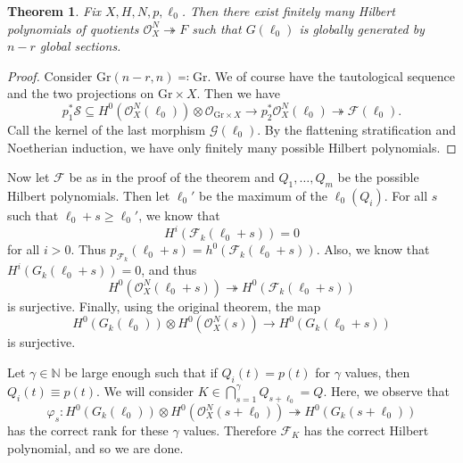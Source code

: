 \documentclass[leqno, openany]{memoir}
\newtheorem{thm}{Theorem}[section]
\theoremstyle{definition}
\theoremstyle{remark}
\theoremstyle{plain}
\theoremstyle{definition}
\theoremstyle{remark}
\newcommand{\mc}[1]{\mathcal{#1}}
\newcommand{\mr}[1]{\mathrm{#1}}
\begin{document}
\begin{thm}
    Fix $X, H, N, p, \ell_0$. Then there exist finitely many Hilbert polynomials of quotients $\mc{O}_X^N \twoheadrightarrow F$ such that $G(\ell_0)$ is globally generated by $n-r$ global sections.
\end{thm}

\begin{proof}
    Consider $\mr{Gr}(n-r, n) \eqqcolon \mr{Gr}$. We of course have the tautological sequence and the two projections on $\mr{Gr} \times X$. Then we have
    \[p_1^* \mc{S} \subseteq H^0(\mc{O}_X^N(\ell_0)) \otimes \mc{O}_{\mr{Gr} \times X} \to p_2^* \mc{O}_X^N(\ell_0) \twoheadrightarrow \mc{F}(\ell_0). \]
    Call the kernel of the last morphism $\mc{G}(\ell_0)$. By the flattening stratification and Noetherian induction, we have only finitely many possible Hilbert polynomials.
\end{proof}

Now let $\mc{F}$ be as in the proof of the theorem and $Q_1, \ldots, Q_m$ be the possible Hilbert polynomials. Then let $\ell_0'$ be the maximum of the $\ell_0(Q_i)$. For all $s$ such that $\ell_0 + s \geq \ell_0'$, we know that
\[ H^i(\mc{F}_k(\ell_0 + s)) = 0 \]
for all $i > 0$. Thus $p_{\mc{F}_k}(\ell_0 + s) = h^0(\mc{F}_k(\ell_0 + s))$. Also, we know that $H^i(G_k(\ell_0 + s)) = 0$, and thus 
\[ H^0(\mc{O}_X^N(\ell_0 + s)) \twoheadrightarrow H^0(\mc{F}_k(\ell_0 + s)) \]
is surjective. Finally, using the original theorem, the map
\[ H^0(G_k(\ell_0)) \otimes H^0(\mc{O}_X^N(s)) \to H^0(G_k(\ell_0 + s)) \]
is surjective.

Let $\gamma \in \mathbb{N}$ be large enough such that if $Q_i(t) = p(t)$ for $\gamma$ values, then $Q_i(t) \equiv p(t)$. We will consider $K \in \bigcap_{s = 1}^{\gamma} Q_{s + \ell_0} = Q$. Here, we observe that
\[ \varphi_s \colon H^0(G_k(\ell_0)) \otimes H^0(\mc{O}_X^N(s+\ell_0)) \twoheadrightarrow H^0(G_k(s + \ell_0)) \]
has the correct rank for these $\gamma$ values. Therefore $\mc{F}_K$ has the correct Hilbert polynomial, and so we are done.
\end{document}
